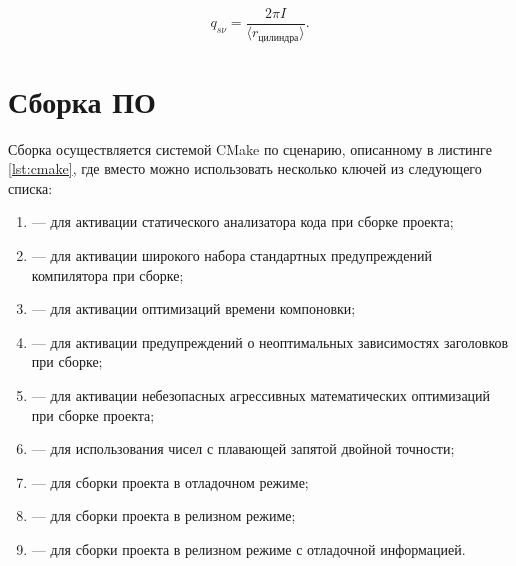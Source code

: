 \begin{equation}
	q_{s\nu} = \frac{2\pi I}{\langle r_{\text{цилиндра}} \rangle}.
\end{equation}




\section{Сборка ПО}

Сборка осуществляется системой CMake по сценарию, описанному в листинге \ref{lst:cmake}, где вместо \code{[options...]} можно использовать несколько ключей из следующего списка:
\begin{enumerate}
	\item {} — для активации статического анализатора кода при сборке проекта;
	\item {} — для активации широкого набора стандартных предупреждений компилятора при сборке;
	\item {} — для активации оптимизаций времени компоновки;
	\item {} — для активации предупреждений о неоптимальных зависимостях заголовков при сборке;
	\item {} — для активации небезопасных агрессивных математических оптимизаций при сборке проекта;
	\item {} — для использования чисел с плавающей запятой двойной точности;
	\item {} — для сборки проекта в отладочном режиме;
	\item {} — для сборки проекта в релизном режиме;
	\item {} — для сборки проекта в релизном режиме с отладочной информацией.
\end{enumerate}


